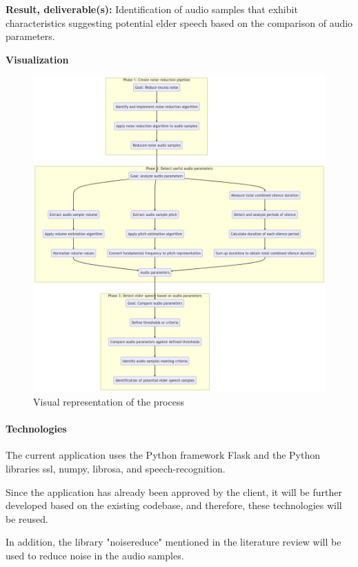 \documentclass[english]{hogent-article}
\begin{document}
\textbf{Result, deliverable(s):} Identification of audio samples that exhibit characteristics suggesting potential elder speech based on the comparison of audio parameters.

\textbf{Visualization}

\begin{figure}[ht]
    \centering
    \includegraphics[width=\linewidth]{img/actionplan.png}
    \caption{Visual representation of the process}
\end{figure}


\paragraph{Technologies}
\label{par:technologies}

The current application uses the Python framework Flask and the Python libraries ssl, numpy, librosa, and speech-recognition.

Since the application has already been approved by the client, it will be further developed based on the existing codebase, and therefore, these technologies will be reused.

In addition, the library "noisereduce" \autocite{Sainburg2022} mentioned in the literature review will be used to reduce noise in the audio samples.
\end{document}
